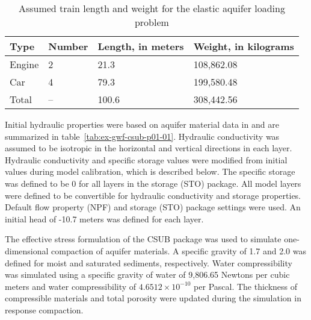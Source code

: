 \small
\begin{longtable}[!htbp]{
                                      p{}
                                      p{}
                                      p{}
                                      p{}
                                      }
	\caption{Assumed train length and weight for the elastic aquifer loading problem} \label{tab:ex-gwf-csub-p01-train} \\

	\hline \hline
	\rowcolor{Gray}
	\textbf{Type} & \textbf{Number} & \textbf{Length, in meters} & \textbf{Weight, in kilograms}  \\
	\hline
	\endhead
	
	Engine & 2 &  21.3 &   108,862.08 \\
	Car      & 4 &    79.3 &   199,580.48 \\ 
	\hline \hline
	Total     & -- & 100.6 &   308,442.56 \\ 
	\hline

\end{longtable}
\normalsize

Initial hydraulic properties were based on aquifer material data in \cite{freeze1979groundwater} and are summarized in table~\ref{tab:ex-gwf-csub-p01-01}. Hydraulic conductivity was assumed to be isotropic in the horizontal and vertical directions in each layer. Hydraulic conductivity and specific storage values were modified from initial values during model calibration, which is described below. The specific storage was defined to be 0 for all layers in the storage (STO) package. All model layers were defined to be convertible for hydraulic conductivity and storage properties. Default flow property (NPF) and storage (STO) package settings were used. An initial head of -10.7 meters was defined for each layer.



The effective stress formulation of the CSUB package was used to simulate one-dimensional compaction of aquifer materials. A specific gravity of 1.7 and 2.0 was defined for moist and saturated sediments, respectively. Water compressibility was simulated using a specific gravity of water of 9,806.65 Newtons per cubic meters and water compressibility of $4.6512 \times 10^{-10}$ per Pascal. The thickness of compressible materials and total porosity were updated during the simulation in response compaction.

